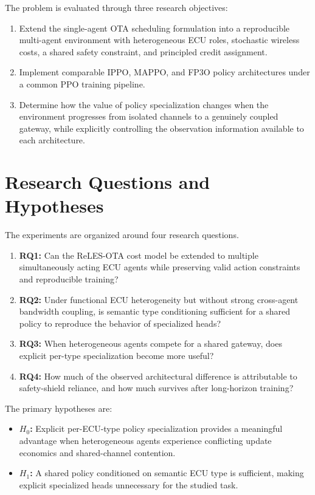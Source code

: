 \documentclass{iutbscthesis}
\begin{document}
The problem is evaluated through three research objectives:
\begin{enumerate}[leftmargin=*]
    \item Extend the single-agent OTA scheduling formulation into a reproducible multi-agent environment with heterogeneous ECU roles, stochastic wireless costs, a shared safety constraint, and principled credit assignment.
    \item Implement comparable IPPO, MAPPO, and FP3O policy architectures under a common PPO training pipeline.
    \item Determine how the value of policy specialization changes when the environment progresses from isolated channels to a genuinely coupled gateway, while explicitly controlling the observation information available to each architecture.
\end{enumerate}

\section{Research Questions and Hypotheses}
The experiments are organized around four research questions.
\begin{enumerate}[leftmargin=*]
    \item \textbf{RQ1:} Can the ReLES-OTA cost model be extended to multiple simultaneously acting ECU agents while preserving valid action constraints and reproducible training?
    \item \textbf{RQ2:} Under functional ECU heterogeneity but without strong cross-agent bandwidth coupling, is semantic type conditioning sufficient for a shared policy to reproduce the behavior of specialized heads?
    \item \textbf{RQ3:} When heterogeneous agents compete for a shared gateway, does explicit per-type specialization become more useful?
    \item \textbf{RQ4:} How much of the observed architectural difference is attributable to safety-shield reliance, and how much survives after long-horizon training?
\end{enumerate}

The primary hypotheses are:
\begin{itemize}[leftmargin=*]
    \item \textbf{$H_0$:} Explicit per-ECU-type policy specialization provides a meaningful advantage when heterogeneous agents experience conflicting update economics and shared-channel contention.
    \item \textbf{$H_1$:} A shared policy conditioned on semantic ECU type is sufficient, making explicit specialized heads unnecessary for the studied task.
\end{itemize}
\end{document}

